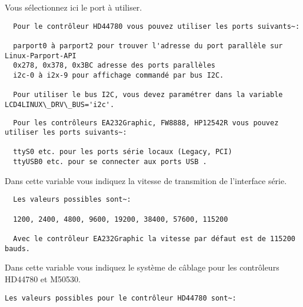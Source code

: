 \begin{description}

  Vous sélectionnez ici le port à utiliser.

\begin{example}
\begin{verbatim}
  Pour le contrôleur HD44780 vous pouvez utiliser les ports suivants~:

  parport0 à parport2 pour trouver l'adresse du port parallèle sur Linux-Parport-API
  0x278, 0x378, 0x3BC adresse des ports parallèles
  i2c-0 à i2x-9 pour affichage commandé par bus I2C.

  Pour utiliser le bus I2C, vous devez paramétrer dans la variable LCD4LINUX\_DRV\_BUS='i2c'.

\end{verbatim}
\end{example}

\begin{example}
\begin{verbatim}
  Pour les contrôleurs EA232Graphic, FW8888, HP12542R vous pouvez utiliser les ports suivants~:

  ttyS0 etc. pour les ports série locaux (Legacy, PCI)
  ttyUSB0 etc. pour se connecter aux ports USB .
\end{verbatim}
\end{example}


  Dans cette variable vous indiquez la vitesse de transmition de l'interface série.

\begin{example}
\begin{verbatim}
  Les valeurs possibles sont~:

  1200, 2400, 4800, 9600, 19200, 38400, 57600, 115200

  Avec le contrôleur EA232Graphic la vitesse par défaut est de 115200 bauds.
\end{verbatim}
\end{example}


  Dans cette variable vous indiquez le système de câblage pour les contrôleurs
  HD44780 et M50530.

\begin{example}
\begin{verbatim}
Les valeurs possibles pour le contrôleur HD44780 sont~:


\end{verbatim}
\end{example}
\end{description}
